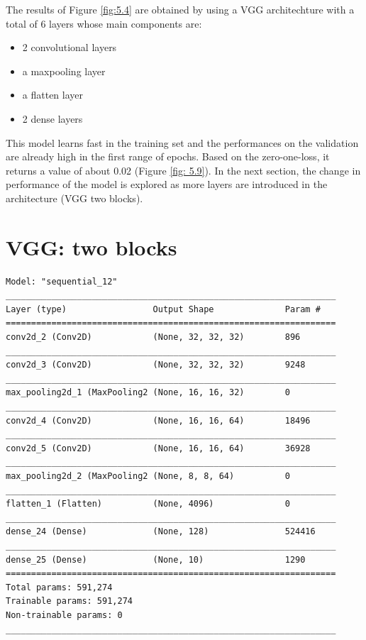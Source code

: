 \documentclass[10pt,english, openany]{book}
\begin{document}
The results of Figure \ref{fig:5.4} are obtained by using a VGG architechture with a total of 6 layers whose main components are:
\begin{itemize}
    \item 2 convolutional layers
    \item a maxpooling layer
    \item a flatten layer
    \item 2 dense layers
\end{itemize}

This model learns fast in the training set and the performances on the validation are already high in the first range of epochs.
Based on the zero-one-loss, it returns a value of about 0.02 (Figure \ref{fig: 5.9}).
In the next section, the change in performance of the model is explored as more layers are introduced in the architecture (VGG two blocks).

\clearpage
\section{VGG: two blocks}


\begin{verbatim}
Model: "sequential_12"
_________________________________________________________________
Layer (type)                 Output Shape              Param #   
=================================================================
conv2d_2 (Conv2D)            (None, 32, 32, 32)        896       
_________________________________________________________________
conv2d_3 (Conv2D)            (None, 32, 32, 32)        9248      
_________________________________________________________________
max_pooling2d_1 (MaxPooling2 (None, 16, 16, 32)        0         
_________________________________________________________________
conv2d_4 (Conv2D)            (None, 16, 16, 64)        18496     
_________________________________________________________________
conv2d_5 (Conv2D)            (None, 16, 16, 64)        36928     
_________________________________________________________________
max_pooling2d_2 (MaxPooling2 (None, 8, 8, 64)          0         
_________________________________________________________________
flatten_1 (Flatten)          (None, 4096)              0         
_________________________________________________________________
dense_24 (Dense)             (None, 128)               524416    
_________________________________________________________________
dense_25 (Dense)             (None, 10)                1290      
=================================================================
Total params: 591,274
Trainable params: 591,274
Non-trainable params: 0
_________________________________________________________________
\end{verbatim}
\end{document}
